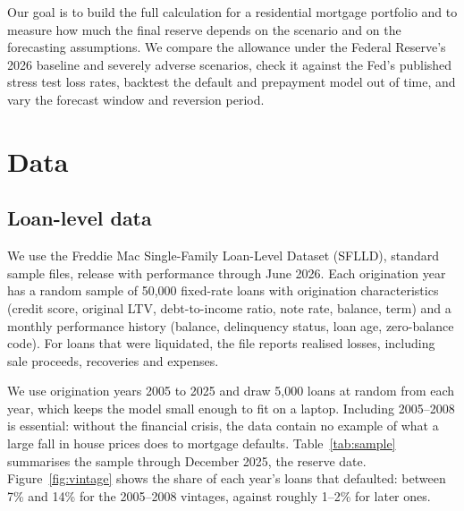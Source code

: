 \documentclass[11pt]{article}
\begin{document}
Our goal is to build the full calculation for a residential mortgage portfolio and to measure how much the final
reserve depends on the scenario and on the forecasting assumptions. We compare the allowance under the Federal
Reserve's 2026 baseline and severely adverse scenarios, check it against the Fed's published stress test loss rates,
backtest the default and prepayment model out of time, and vary the forecast window and reversion period.

\section{Data}

\subsection{Loan-level data}
We use the Freddie Mac Single-Family Loan-Level Dataset (SFLLD), standard sample files, release with performance
through June 2026. Each origination year has a random sample of 50,000 fixed-rate loans with origination
characteristics (credit score, original LTV, debt-to-income ratio, note rate, balance, term) and a monthly
performance history (balance, delinquency status, loan age, zero-balance code). For loans that were liquidated,
the file reports realised losses, including sale proceeds, recoveries and expenses.

We use origination years 2005 to 2025 and draw 5,000 loans at random from each year, which keeps the model small
enough to fit on a laptop. Including 2005--2008 is essential: without the financial crisis, the data contain no
example of what a large fall in house prices does to mortgage defaults. Table~\ref{tab:sample} summarises the
sample through December 2025, the reserve date. Figure~\ref{fig:vintage} shows the share of each year's loans
that defaulted: between 7\% and 14\% for the 2005--2008 vintages, against roughly 1--2\% for later ones.
\end{document}
